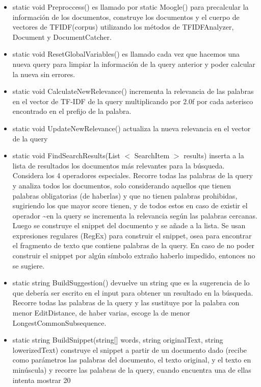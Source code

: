 \documentclass[a4paper,12pt]{article}
\begin{document}
\begin{itemize}
    \item static void Preproccess() es llamado por static Moogle() para precalcular la información de los
    documentos, construye los documentos y el cuerpo de vectores de TFIDF(corpus)
    utilizando los métodos de TFIDFAnalyzer, Document y DocumentCatcher.
    \item static void ResetGlobalVariables() es llamado cada vez que hacemos una nueva query para limpiar la
    información de la query anterior y poder calcular la nueva sin errores.
    \item static void CalculateNewRelevance() incrementa la relevancia de las palabras en el vector de TF-IDF
    de la query multiplicando por 2.0f por cada asterisco encontrado en el prefijo de la
    palabra.
    \item static void UpdateNewRelevance() actualiza la nueva relevancia en el vector de la query
    \item static void FindSearchResults(List $<$ SearchItem $>$ results) inserta a la lista de resultados los documentos más relevantes para la
    búsqueda. Considera los 4 operadores especiales. Recorre todas las palabras de la query y
    analiza todos los documentos, solo considerando aquellos que tienen palabras
    obligatorias (de haberlas) y que no tienen palabras prohibidas, sugiriendo los que mayor
    score tienen, y de todos estos en caso de existir el operador \textasciitilde en la query se incrementa la 
    relevancia según las palabras cercanas. Luego se construye el snippet del documento y se
    añade a la lista. Se usan expresiones regulares (RegEx) para construir el snippet, osea
    para encontrar el fragmento de texto que contiene palabras de la query. En caso de no
    poder construir el snippet por algún símbolo extraño haberlo impedido, entonces no se
    sugiere.
    \item static string BuildSuggestion() devuelve un string que es la sugerencia de lo que debería ser escrito en
    el input para obtener un resultado en la búsqueda. Recorre todas las palabras de la query
    y las sustituye por la palabra con menor EditDistance, de haber varias, escoge la de
    menor LongestCommonSubsequence.
    \item static string BuildSnippet(string[] words, string originalText, string lowerizedText) construye el snippet a partir de un documento dado (recibe como
    parámetros las palabras del documento, el texto original, y el texto en minúscula) y
    recorre las palabras de la query, cuando encuentra una de ellas intenta mostrar 20

\end{itemize}
\end{document}
